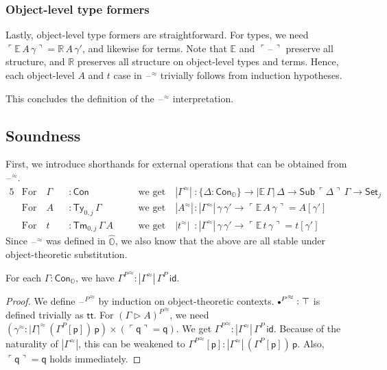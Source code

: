 \documentclass[acmsmall,anonymous,review]{acmart}
\newcommand{\msf}[1]{\mathsf{#1}}
\newcommand{\mbb}[1]{\mathbb{#1}}
\newcommand{\ext}{\triangleright}
\newcommand{\mbbo}{\mbb{O}}
\newcommand{\Con}{\msf{Con}}
\newcommand{\Sub}{\msf{Sub}}
\newcommand{\Ty}{\msf{Ty}}
\newcommand{\Tm}{\msf{Tm}}
\newcommand{\Cono}{\msf{Con}_{\mbbo}}
\newcommand{\p}{\mathsf{p}}
\newcommand{\q}{\mathsf{q}}
\renewcommand{\tt}{\msf{tt}}
\newcommand{\emptycon}{\scaleobj{.75}\bullet}
\newcommand{\id}{\msf{id}}
\newcommand{\Set}{\mathsf{Set}}
\newcommand{\blank}{{\mathord{\hspace{1pt}\text{--}\hspace{1pt}}}}
\newcommand{\emb}[1]{\ulcorner#1\urcorner}
\newcommand{\hato}{\bm\hat{\mbbo}}
\newcommand{\ev}{\mbb{E}}
\newcommand{\re}{\mbb{R}}
\theoremstyle{remark}
\newcommand{\rel}{^{\approx}}
\begin{document}
\subsubsection{Object-level type formers}
Lastly, object-level type formers are straightforward. For types, we need
$\emb{\ev\,A\,\gamma} = \re\,A\,\gamma'$, and likewise for terms. Note that
$\ev$ and $\emb{\blank}$ preserve all structure, and $\re$ preserves all
structure on object-level types and terms. Hence, each object-level $A$ and $t$
case in $\blank\rel$ trivially follows from induction hypotheses.

This concludes the definition of the $\blank\rel$ interpretation.

\subsection{Soundness}

\begin{definition} First, we introduce shorthands for
external operations that can be obtained from $\blank\rel$.
\begin{alignat*}{5}
  & \text{For}\hspace{1em} \Gamma &&: \Con \hspace{1em}&&\text{we get}\hspace{1em}
         |\Gamma\rel| &&: \{\Delta : \Cono\} \to |\ev\,\Gamma|\,\Delta \to \Sub\,\emb{\Delta}\,\Gamma \to \Set_j\\
  & \text{For}\hspace{1em} A &&: \Ty_{0,j}\,\Gamma \hspace{1em}&&\text{we get}\hspace{1em} |A\rel| &&: |\Gamma\rel|\,\gamma\,\gamma' \to \emb{\ev\,A\,\gamma} = A[\gamma']\\
  & \text{For}\hspace{1em} t &&: \Tm_{0,j}\,\Gamma\,A \hspace{1em}&&\text{we get}\hspace{1em}|t\rel| &&: |\Gamma\rel|\,\gamma\,\gamma' \to \emb{\ev\,t\,\gamma} = t[\gamma']
\end{alignat*}
Since $\blank\rel$ was defined in $\hato$, we also know that the above are all
stable under object-theoretic substitution.
\end{definition}

\begin{theorem}
For each $\Gamma : \Cono$, we have ${\Gamma^P}\rel : |\Gamma\rel|\,\Gamma^P\,\id$.
\end{theorem}
\begin{proof}
We define ${\blank^P}\rel$ by induction on object-theoretic contexts.
${\emptycon^P}\rel : \top$ is defined trivially as $\tt$. For ${(\Gamma \ext
  A)^P}\rel$, we need $(\gamma\rel : |\Gamma|\rel\,(\Gamma^P[\p])\,\p) \times
(\emb{\q} = \q)$. We get ${\Gamma^P}\rel : |\Gamma\rel|\,\Gamma^P\,\id$. Because
of the naturality of $|\Gamma\rel|$, this can be weakened to ${\Gamma^P}\rel[\p]
: |\Gamma\rel|\,(\Gamma^P[\p])\,\p$. Also, $\emb{\q} = \q$ holds immediately.
\end{proof}
\end{document}
